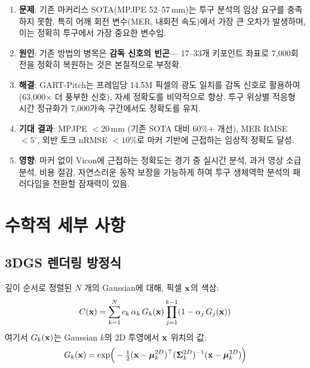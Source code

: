 \documentclass[11pt, a4paper]{report}
\begin{document}
\begin{summary}[title={핵심 논증 요약}]
\begin{enumerate}[leftmargin=*]
  \item \textbf{문제}: 기존 마커리스 SOTA(MPJPE 52--57\,mm)는 투구 분석의 임상 요구를 충족하지 못함.
        특히 어깨 회전 변수(MER, 내회전 속도)에서 가장 큰 오차가 발생하며,
        이는 정확히 투구에서 가장 중요한 변수임.

  \item \textbf{원인}: 기존 방법의 병목은 \textbf{감독 신호의 빈곤}---
        17--33개 키포인트 좌표로 7,000\degps 회전을 정확히 복원하는 것은 본질적으로 부정확.

  \item \textbf{해결}: GART-Pitch는 프레임당 14.5M 픽셀의 광도 일치를 감독 신호로 활용하여
        (63,000$\times$ 더 풍부한 신호), 자세 정확도를 비약적으로 향상.
        투구 위상별 적응형 시간 정규화가 7,000\degps 가속 구간에서도 정확도를 유지.

  \item \textbf{기대 결과}: MPJPE $< 20$\,mm (기존 SOTA 대비 60\%+ 개선),
        MER RMSE $< 5^\circ$, 외반 토크 nRMSE $< 10\%$로
        마커 기반에 근접하는 임상적 정확도 달성.

  \item \textbf{영향}: 마커 없이 Vicon에 근접하는 정확도는
        경기 중 실시간 분석, 과거 영상 소급 분석, 비용 절감, 자연스러운 동작 보장을 가능하게 하여
        투구 생체역학 분석의 패러다임을 전환할 잠재력이 있음.
\end{enumerate}
\end{summary}


\appendix

\chapter{수학적 세부 사항}

\section{3DGS 렌더링 방정식}

깊이 순서로 정렬된 $N$ 개의 Gaussian에 대해, 픽셀 $\mathbf{x}$의 색상:
\begin{equation}
  C(\mathbf{x}) = \sum_{k=1}^{N} c_k \, \alpha_k \, G_k(\mathbf{x}) \prod_{j=1}^{k-1}(1 - \alpha_j \, G_j(\mathbf{x}))
\end{equation}
여기서 $G_k(\mathbf{x})$는 Gaussian $k$의 2D 투영에서 $\mathbf{x}$ 위치의 값:
\begin{equation}
  G_k(\mathbf{x}) = \exp\!\Big(-\tfrac{1}{2}(\mathbf{x} - \bm{\mu}_k^{2D})^\top (\bm{\Sigma}_k^{2D})^{-1}(\mathbf{x} - \bm{\mu}_k^{2D})\Big)
\end{equation}
\end{document}
